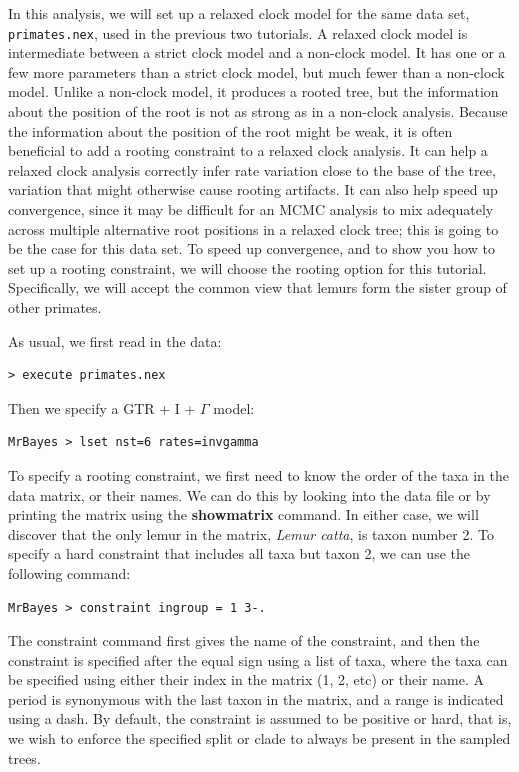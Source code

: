 \documentclass[12pt]{book}
\begin{document}
In this analysis, we will set up a relaxed clock model for the same data set,
\texttt{primates.nex}, used in the previous two tutorials. A relaxed clock model is intermediate
between a strict clock model and a non-clock model. It has one or a few more parameters than a
strict clock model, but much fewer than a non-clock model. Unlike a non-clock model, it produces a
rooted tree, but the information about the position of the root is not as strong as in a non-clock
analysis.  Because the information about the position of the root might be weak, it is often
beneficial to add a rooting constraint to a relaxed clock analysis. It can help a relaxed clock
analysis correctly infer rate variation close to the base of the tree, variation that might
otherwise cause rooting artifacts. It can also help speed up convergence, since it may be difficult
for an MCMC analysis to mix adequately across multiple alternative root positions in a relaxed
clock tree; this is going to be the case for this data set. To speed up convergence, and to show
you how to set up a rooting constraint, we will choose the rooting option for this tutorial.
Specifically, we will accept the common view that lemurs form the sister group of other primates.

As usual, we first read in the data:

\begin{verbatim}
> execute primates.nex
\end{verbatim}

Then we specify a GTR + I + $\Gamma$ model:

\begin{verbatim}
MrBayes > lset nst=6 rates=invgamma
\end{verbatim}

To specify a rooting constraint, we first need to know the order of the taxa in the data matrix, or
their names. We can do this by looking into the data file or by printing the matrix using the
\textbf{showmatrix} command. In either case, we will discover that the only lemur in the matrix,
\textit{Lemur catta}, is taxon number 2. To specify a hard constraint that includes all taxa but
taxon 2, we can use the following command:

\begin{verbatim}
MrBayes > constraint ingroup = 1 3-.
\end{verbatim}

The constraint command first gives the name of the constraint, and then the constraint is specified
after the equal sign using a list of taxa, where the taxa can be specified using either their index
in the matrix (1, 2, etc) or their name. A period is synonymous with the last taxon in the matrix,
and a range is indicated using a dash. By default, the constraint is assumed to be positive or
hard, that is, we wish to enforce the specified split or clade to always be present in the sampled
trees.
\end{document}
